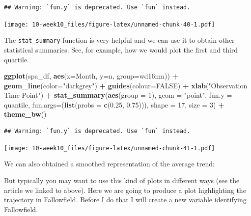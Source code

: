 \documentclass[]{book}
\newenvironment{Shaded}{\begin{snugshade}}{\end{snugshade}}
\newcommand{\DataTypeTok}[1]{\textcolor[rgb]{0.13,0.29,0.53}{#1}}
\newcommand{\DecValTok}[1]{\textcolor[rgb]{0.00,0.00,0.81}{#1}}
\newcommand{\FloatTok}[1]{\textcolor[rgb]{0.00,0.00,0.81}{#1}}
\newcommand{\KeywordTok}[1]{\textcolor[rgb]{0.13,0.29,0.53}{\textbf{#1}}}
\newcommand{\NormalTok}[1]{#1}
\newcommand{\OperatorTok}[1]{\textcolor[rgb]{0.81,0.36,0.00}{\textbf{#1}}}
\newcommand{\OtherTok}[1]{\textcolor[rgb]{0.56,0.35,0.01}{#1}}
\newcommand{\StringTok}[1]{\textcolor[rgb]{0.31,0.60,0.02}{#1}}
\begin{document}
\begin{verbatim}
## Warning: `fun.y` is deprecated. Use `fun` instead.
\end{verbatim}

\texttt{[image: 10-week10\_files/figure-latex/unnamed-chunk-40-1.pdf]}

The \texttt{stat\_summary} function is very helpful and we can use it to obtain other statistical summaries. See, for example, how we would plot the first and third quartile.

\begin{Shaded}
\begin{Highlighting}[]
\KeywordTok{ggplot}\NormalTok{(spa_df, }\KeywordTok{aes}\NormalTok{(}\DataTypeTok{x=}\NormalTok{Month, }\DataTypeTok{y=}\NormalTok{n, }\DataTypeTok{group=}\NormalTok{wd16nm)) }\OperatorTok{+}\StringTok{ }
\StringTok{  }\KeywordTok{geom_line}\NormalTok{(}\DataTypeTok{color=}\StringTok{"darkgrey"}\NormalTok{) }\OperatorTok{+}\StringTok{ }\KeywordTok{guides}\NormalTok{(}\DataTypeTok{colour=}\OtherTok{FALSE}\NormalTok{) }\OperatorTok{+}\StringTok{ }\KeywordTok{xlab}\NormalTok{(}\StringTok{"Observation Time Point"}\NormalTok{) }\OperatorTok{+}\StringTok{ }
\StringTok{  }\KeywordTok{stat_summary}\NormalTok{(}\KeywordTok{aes}\NormalTok{(}\DataTypeTok{group =} \DecValTok{1}\NormalTok{), }\DataTypeTok{geom =} \StringTok{"point"}\NormalTok{, }\DataTypeTok{fun.y =}\NormalTok{ quantile, }
  \DataTypeTok{fun.args=}\NormalTok{(}\KeywordTok{list}\NormalTok{(}\DataTypeTok{probs =} \KeywordTok{c}\NormalTok{(}\FloatTok{0.25}\NormalTok{, }\FloatTok{0.75}\NormalTok{))), }\DataTypeTok{shape =} \DecValTok{17}\NormalTok{, }\DataTypeTok{size =} \DecValTok{3}\NormalTok{) }\OperatorTok{+}
\StringTok{  }\KeywordTok{theme_bw}\NormalTok{()}
\end{Highlighting}
\end{Shaded}

\begin{verbatim}
## Warning: `fun.y` is deprecated. Use `fun` instead.
\end{verbatim}

\texttt{[image: 10-week10\_files/figure-latex/unnamed-chunk-41-1.pdf]}

We can also obtained a smoothed representation of the average trend:

But typically you may want to use this kind of plots in different ways (see the article we linked to above). Here we are going to produce a plot highlighting the trajectory in Fallowfield. Before I do that I will create a new variable identifying Fallowfield.
\end{document}

